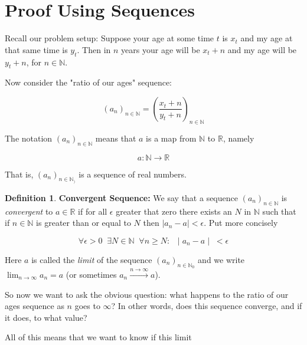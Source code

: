\documentclass[11pt, oneside]{article}          %
\theoremstyle{definition}
\newtheorem{definition}{Definition}[section]
\begin{document}
\smallskip
\section{Proof Using Sequences}
Recall our problem setup: Suppose your age at some time 
$t$ is $x_t$ and my age at that same time is $y_t$. Then 
in $n$ years your age will be $x_t + n$ and my age will 
be $y_t + n$, for $n \in \mathbb{N}$. 

\bigskip
\noindent
Now consider the "ratio of our ages" sequence:

\medskip
\begin{equation*}
(a_n)_{n \in \mathbb{N}} = \left (\dfrac{x_t +n}{y_t + n}\right )_{n \in \mathbb{N}}
\end{equation*}

\bigskip
\noindent 
The notation $(a_n)_{n \in \mathbb{N}}$ means that $a$ is a map from
$\mathbb{N}$ to $\mathbb{R}$, namely

\begin{equation*}
a: \mathbb{N} \to \mathbb{R}
\end{equation*}

\bigskip
\noindent
That is, $(a_n)_{n \in \mathbb{N}_{)}}$ is a sequence of real numbers.

\bigskip
\noindent 
\begin{definition}{\bf Convergent Sequence: }  We say that a sequence 
$(a_n)_{n \in \mathbb{N}}$ is \emph{convergent} to $a \in
\mathbb{R}$ if for all $\epsilon$ greater that zero there exists
an $N$ in $\mathbb{N}$ such that if $n \in \mathbb{N}$ is greater
than or equal to $N$ then $\mid a_n - a \mid < \epsilon$. Put
more concisely

\begin{equation*}
\forall \epsilon > 0 \;\; \exists N \in \mathbb{N} \;\; 
 \forall n \geq N : \;\; \mid a_n - a \mid \; < \epsilon
\end{equation*}

\bigskip
\noindent
Here $a$ is called the \emph{limit} of the sequence $(a_n)_{n \in
\mathbb{N}_{0}}$ and we write ${\displaystyle \lim_{n \to \infty} a_n
= a}$ (or sometimes $a_n \xrightarrow{n \to \infty}{} a$).
\end{definition}


\noindent
So now we want to ask the obvious question: what happens to the
ratio of our ages sequence as $n$ goes to $\infty$? In other
words, does this sequence converge, and if it does, to what
value?

\bigskip
\noindent
All of this means that we want to know if this limit 
\end{document}
